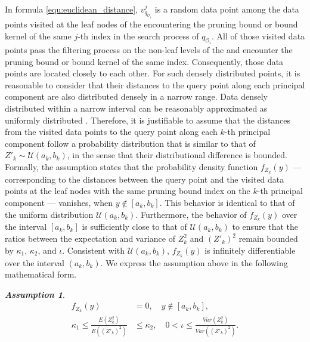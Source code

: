 In formula \ref{equ:euclidean_distance}, $v^{j}_{q_{\mathcal{O}_i}}$ is a random data point among the data points visited at the leaf nodes of the \dualtree encountering the pruning bound or bound kernel of the same $j$-th index in the search process of $q_{\mathcal{O}_i}$. All of those visited data points pass the filtering process on the non-leaf levels of the \dualtree and encounter the pruning bound or bound kernel of the same index. Consequently, those data points are located closely to each other. For such densely distributed points, it is reasonable to consider that their distances to the query point along each principal component are also distributed densely in a narrow range. Data densely distributed within a narrow interval can be reasonably approximated as uniformly distributed \cite{gning2010mixture, reiss1981uniform, chasani2022uu}. Therefore, it is justifiable to assume that the distances from the visited data points to the query point along each $k$-th principal component follow a probability distribution that is similar to that of $Z'_k \sim \mathcal{U}(a_k, b_k)$, in the sense that their distributional difference is bounded. Formally, the assumption states that the probability density function $f_{Z_k}(y)$ — corresponding to the distances between the query point and the visited data points at the leaf nodes with the same pruning bound index on the \(k\)-th principal component — vanishes, when $y\notin [a_k, b_k]$. This behavior is identical to that of the uniform distribution $\mathcal{U}(a_k, b_k)$. Furthermore, the behavior of $f_{Z_k}(y)$ over the interval $[a_k, b_k]$ is sufficiently close to that of $\mathcal{U}(a_k, b_k)$ to ensure that the ratios between the expectation and variance of $Z_k^2$ and $(Z'_k)^2$ remain bounded by $\kappa_1$, $\kappa_2$, and $\iota$. Consistent with $\mathcal{U}(a_k,b_k)$, $f_{Z_k}(y)$ is infinitely differentiable over the interval $(a_k,b_k)$. We express the assumption above in the following mathematical form.

\noindent \textbf{\textit{Assumption 1}}.
\begin{equation}
\begin{aligned}
f_{Z_k}(y)&=0,\quad y\notin[a_k,b_k],\\
\kappa_1 \leq \frac{E(Z_k^2)}{E((Z'_k)^2)}
&\leq \kappa_2,\quad
0<\iota\leq \frac{Var(Z_k^2)}{Var((Z'_k)^2)} .
\end{aligned}
\end{equation}

